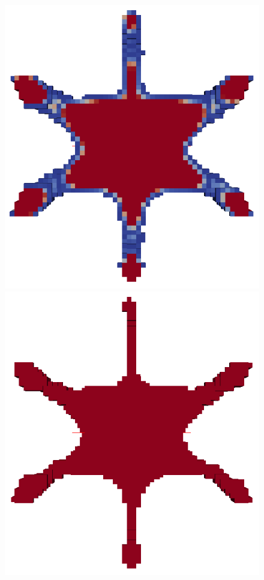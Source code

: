 \begin{frame}
\begin{minipage}{0.85\textwidth}
{\begin{figure}
			\includegraphics[scale=0.06]{Pictures/TopOp/Star_Optimized3_Trans.png}
			\includegraphics[scale=0.06]{Pictures/TopOp/Star_Optimized4_Trans.png}

\end{figure}}
\end{minipage}
\end{frame}
